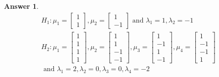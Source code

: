 \documentclass[12pt]{article}
\theoremstyle{colon}
\newtheorem*{answer}{Answer}
\begin{document}
\begin{answer}
  \begin{gather*}
    H_1: \mu_1 = \begin{bmatrix} 1 \\ 1 \end{bmatrix}, \mu_2 = \begin{bmatrix} 1 \\ -1 \end{bmatrix} \text{ and } \lambda_1 = 1, \lambda_2 = -1 \\
    H_2: \mu_1 = \begin{bmatrix} 1 \\ 1 \\ 1 \\ 1 \end{bmatrix}, \mu_2 = \begin{bmatrix} 1 \\ 1 \\ -1 \\ -1 \end{bmatrix}, \mu_3 = \begin{bmatrix} 1 \\ -1 \\ 1 \\ -1 \end{bmatrix}, \mu_4 = \begin{bmatrix} 1 \\ -1 \\ -1 \\ 1 \end{bmatrix} \\
    \text{ and } \lambda_1 = 2, \lambda_2 = 0, \lambda_3 = 0, \lambda_4 = -2
  \end{gather*}
\end{answer}
\end{document}
